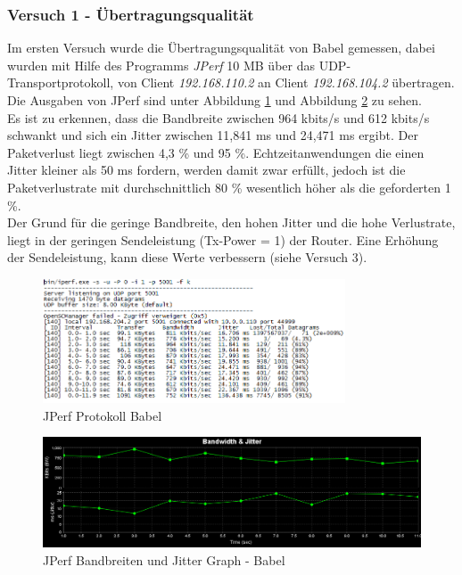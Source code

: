 \documentclass[10pt]{scrartcl}
\begin{document}
\subsubsection{Versuch 1 - Übertragungsqualität}
Im ersten Versuch wurde die Übertragungsqualität von Babel gemessen, dabei wurden mit Hilfe des Programms \textit{JPerf} 10 MB über das UDP-Transportprotokoll, von Client \textit{192.168.110.2} an Client \textit{192.168.104.2} übertragen.\\
Die Ausgaben von JPerf sind unter Abbildung \ref{fig:JPerf_Babel_Protokoll} und Abbildung \ref{fig:JPerf_Babel_Graph} zu sehen.\\
Es ist zu erkennen, dass die Bandbreite zwischen 964 kbits/s und 612 kbits/s schwankt und sich ein Jitter zwischen 11,841 ms und 24,471 ms ergibt. Der Paketverlust liegt zwischen 4,3 \% und  95 \%. Echtzeitanwendungen die einen Jitter kleiner als 50 ms fordern, werden damit zwar erfüllt, jedoch ist die Paketverlustrate mit durchschnittlich 80 \% wesentlich höher als die geforderten 1 \%.\\
Der Grund für die geringe Bandbreite, den hohen Jitter und die hohe Verlustrate, liegt in der geringen Sendeleistung (Tx-Power = 1) der Router. Eine Erhöhung der Sendeleistung, kann diese Werte verbessern (siehe Versuch 3).

\begin{figure}[htbp]
	\centering	\includegraphics[width=0.8\textwidth]{Grafiken/Babel_TX1_Protokoll.png}
	\caption{JPerf Protokoll Babel}
	\label{fig:JPerf_Babel_Protokoll}
\end{figure}

\begin{figure}[htbp]
	\centering	\includegraphics[width=1.0\textwidth]{Grafiken/Babel_TX1_Grafik.png}
	\caption{JPerf Bandbreiten und Jitter Graph - Babel}
	\label{fig:JPerf_Babel_Graph}
\end{figure}
\end{document}
